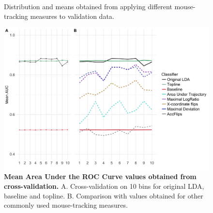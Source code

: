 \documentclass[draft]{article}
\begin{document}
\begin{figure}
\caption{Distribution and means obtained from applying different mouse-tracking measures to validation data.}
\label{fig:different.measures.validation}

\end{figure}


\begin{figure}
\centering
\includegraphics[width=\textwidth]{auc_calibration_2.png}
\caption{\textbf{Mean Area Under the ROC Curve values obtained from cross-validation.} A. Cross-validation on 10 bins for original LDA, baseline and topline. B. Comparison with values obtained for other commonly used mouse-tracking measures.} \label{DIST:AUC}
\label{DIST:AUC2}
\end{figure}
\end{document}
